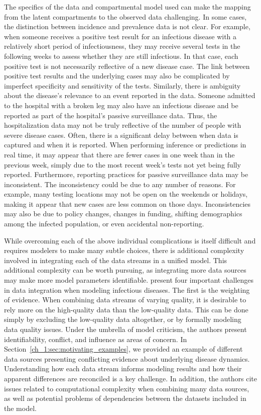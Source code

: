 The specifics of the data and compartmental model used can make the mapping from the latent compartments to the observed data challenging.
In some cases, the distinction between incidence and prevalence data is not clear.
For example, when someone receives a positive test result for an infectious disease with a relatively short period of infectiousness, they may receive several tests in the following weeks to assess whether they are still infectious.
In that case, each positive test is not necessarily reflective of a new disease case.
The link between positive test results and the underlying cases may also be complicated by imperfect specificity and sensitivity of the tests.
Similarly, there is ambiguity about the disease's relevance to an event reported in the data.
Someone admitted to the hospital with a broken leg may also have an infectious disease and be reported as part of the hospital's passive surveillance data.
Thus, the hospitalization data may not be truly reflective of the number of people with severe disease cases.
Often, there is a significant delay between when data is captured and when it is reported.
When performing inference or predictions in real time, it may appear that there are fewer cases in one week than in the previous week, simply due to the most recent week's tests not yet being fully reported.
Furthermore, reporting practices for passive surveillance data may be inconsistent.
The inconsistency could be due to any number of reasons.
For example, many testing locations may not be open on the weekends or holidays, making it appear that new cases are less common on those days.
Inconsistencies may also be due to policy changes, changes in funding, shifting demographics among the infected population, or even accidental non-reporting.

While overcoming each of the above individual complications is itself difficult and requires modelers to make many subtle choices, there is additional complexity involved in integrating each of the data streams in a unified model.
This additional complexity can be worth pursuing, as integrating more data sources may make more model parameters identifiable.
\citet{DeAngelis2015four} present four important challenges in data integration when modeling infectious diseases.
The first is the weighting of evidence.
When combining data streams of varying quality, it is desirable to rely more on the high-quality data than the low-quality data.
This can be done simply by excluding the low-quality data altogether, or by formally modeling data quality issues.
Under the umbrella of model criticism, the authors present identifiability, conflict, and influence as areas of concern.
In Section~\ref{ch_1:sec:motivating_examples}, we provided an example of different data sources presenting conflicting evidence about underlying disease dynamics.
Understanding how each data stream informs modeling results and how their apparent differences are reconciled is a key challenge.
In addition, the authors cite issues related to computational complexity when combining many data sources, as well as potential problems of dependencies between the datasets included in the model.

